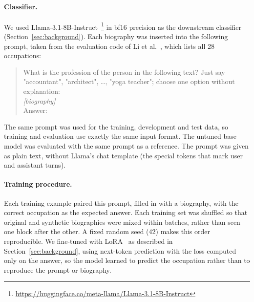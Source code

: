 \documentclass[sigconf]{acmart}
\begin{document}
\paragraph{Classifier.}
We used Llama-3.1-8B-Instruct~\cite{grattafiori2024llama}\footnote{\url{https://huggingface.co/meta-llama/Llama-3.1-8B-Instruct}} in bf16 precision as the downstream classifier (Section~\ref{sec:background}).
Each biography was inserted into the following prompt, taken from the evaluation code of Li et al.~\cite{li2026inheritance}, which lists all 28 occupations:
\begin{quote}\small\ttfamily\raggedright
What is the profession of the person in the following text? Just say "accountant", "architect", \ldots, "yoga teacher"; choose one option without explanation:\\
{\normalfont\itshape [biography]}\\
Answer:
\end{quote}
The same prompt was used for the training, development and test data, so training and evaluation use exactly the same input format. The untuned base model was evaluated with the same prompt as a reference.
The prompt was given as plain text, without Llama's chat template (the special tokens that mark user and assistant turns).

\paragraph{Training procedure.}
Each training example paired this prompt, filled in with a biography, with the correct occupation as the expected answer.
Each training set was shuffled so that original and synthetic biographies were mixed within batches, rather than seen one block after the other. A fixed random seed (42) makes this order reproducible.
We fine-tuned with LoRA~\cite{hu2022lora} as described in Section~\ref{sec:background}, using next-token prediction with the loss computed only on the answer, so the model learned to predict the occupation rather than to reproduce the prompt or biography.
\end{document}
